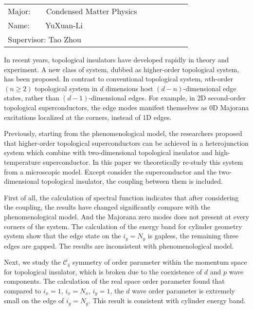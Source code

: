 \newpage
{\centering {}}
\bigskip
{
	\begin{center}
		\begin{tabular}{l}
			Major:$\quad\quad$Condensed Matter Physics$\quad\qquad$$\quad\qquad$\\
			Name:$\quad\quad$YuXuan-Li$\quad\qquad$$\quad\qquad$\\
			Supervisor: Tao Zhou$\quad\qquad$\\
		\end{tabular}
\end{center}}
\bigskip
\bigskip
\bigskip

{}

 In recent years, topological insulators have developed rapidly in theory and experiment.  A new class of system,
 dubbed as higher-order topological system, has been proposed. In contrast to conventional topological system, $n$th-order$(n\geq 2)$ topological system in $d$ dimensions host $(d-n)$-dimensional edge states, rather than $(d − 1)$-dimensional edges. For example, in 2D second-order topological superconductors, the edge modes manifest themselves as 0D Majorana excitations localized at the corners, instead of 1D edges.
 
Previously, starting from the phenomenological model, the researchers proposed that higher-order topological superconductors can be achieved in a heterojunction system which combine with two-dimensional topological insulator and high-temperature superconductor. In this paper we theoretically re-study this system from a microscopic model. Except consider the superconductor and the two-dimensional topological insulator, the coupling between them is included.

First of all, the calculation of spectral function indicates that after considering the coupling, the results have changed significantly compare with the phenomenological model. And the Majorana zero modes does not present at every corners of the system. The calculation of the energy band for  cylinder geometry system show that the edge state on the $i_y=N_y$ is gapless, the remaining three edges are gapped. The results are inconsistent with phenomenological model.

Next, we study the $\mathcal{C}_4$ symmetry of order parameter within the momentum space for topological insulator,  which is broken due to the coexistence of $d$ and $p$ wave components. The calculation of the real space order parameter found that compared to $i_x=1$, $i_x=N_x$, $i_y=1$, the $d$ wave order parameter is extremely small on the edge of $i_y=N_y$. This result is consistent with cylinder energy band.

